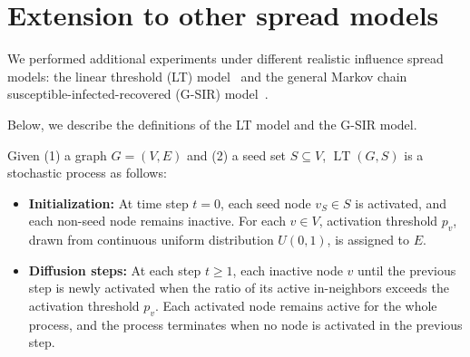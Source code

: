 \section{Extension to other spread models}\label{sec:diff_model}

We performed additional experiments under different realistic influence spread models: the linear threshold (LT) model~\citep{kempe2003maximizing} and the general Markov chain susceptible-infected-recovered (G-SIR) model~\citep{yi2022edge}.

Below, we describe the definitions of the LT model and the G-SIR model.

\begin{definition}\label{def:LT}
    Given 
    (1) a graph $G = (V, E)$ and
    (2) a seed set $S \subseteq V$,
    $\operatorname{LT}(G, S)$ is a stochastic process as follows:
    \begin{itemize}[leftmargin=*,topsep=0pt]
        \item \textbf{Initialization:}         
        At time step $t = 0$, each seed node $v_S \in S$ is activated, and each non-seed node remains inactive. For each $v \in V$, activation threshold $p_v$, drawn from continuous uniform distribution $U(0, 1)$, is assigned to $E$.
        \item \textbf{Diffusion steps:}
        At each step $t \geq 1$,
        each inactive node $v$ until the previous step is newly activated when the ratio of its active in-neighbors exceeds the activation threshold $p_v$.
        Each activated node remains active for the whole process, and the process terminates when no node is activated in the previous step.
    \end{itemize}
\end{definition}

